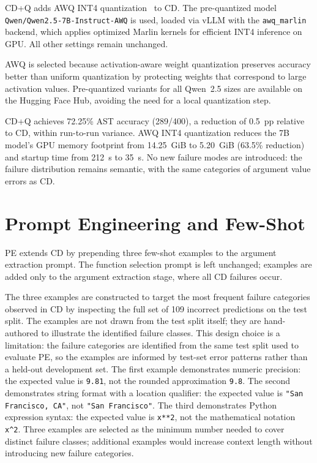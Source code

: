 CD+Q adds AWQ INT4 quantization~\cite{lin2024awq}
to CD. The pre-quantized model
\texttt{Qwen/\allowbreak{}Qwen2.5-\allowbreak{}7B-\allowbreak{}Instruct-\allowbreak{}AWQ} is used, loaded via
vLLM with the \texttt{awq\_marlin} backend, which applies
optimized Marlin kernels for efficient INT4 inference on
GPU. All other settings remain unchanged.

AWQ is selected because activation-aware weight quantization
preserves accuracy better than uniform quantization by
protecting weights that correspond to large activation
values. Pre-quantized variants for all Qwen~2.5 sizes are
available on the Hugging Face Hub, avoiding the need for
a local quantization step.

CD+Q achieves 72.25\% AST accuracy (289/400), a reduction
of 0.5~pp relative to CD, within run-to-run variance.
AWQ INT4 quantization reduces the 7B model's GPU memory
footprint from 14.25~GiB to 5.20~GiB (63.5\% reduction)
and startup time from 212~s to 35~s. No new failure modes
are introduced: the failure distribution remains semantic,
with the same categories of argument value errors as CD.

\section{Prompt Engineering and Few-Shot}

PE extends CD by prepending three few-shot examples to the
argument extraction prompt. The function selection prompt is left unchanged;
examples are added only to the argument extraction stage, where all CD
failures occur.

The three examples are constructed to target the most frequent failure
categories observed in CD by inspecting the full set of 109 incorrect
predictions on the test split. The examples are not drawn from the test
split itself; they are hand-authored to illustrate the identified
failure classes. This design choice is a limitation: the failure
categories are identified from the same test split used to evaluate PE,
so the examples are informed by test-set error patterns rather than a
held-out development set. The first example demonstrates numeric
precision: the expected value is \texttt{9.81}, not the rounded approximation
\texttt{9.8}. The second demonstrates string format with a location qualifier:
the expected value is \texttt{"San Francisco, CA"}, not
\texttt{"San Francisco"}. The third demonstrates Python expression syntax: the
expected value is \texttt{x**2}, not the mathematical notation
\texttt{x\textasciicircum{}2}. Three examples are selected as the minimum number needed to
cover distinct failure classes; additional examples would increase context
length without introducing new failure categories.

